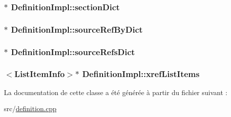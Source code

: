 \subsubsection[{section\+Dict}]{$\ast$ Definition\+Impl\+::section\+Dict}\label{class_definition_impl_a34e4463846d5f873f07509ae80e38724}
\hypertarget{class_definition_impl_a854eb82c0fc4b42d42892b42ce924e39}{}
\subsubsection[{source\+Ref\+By\+Dict}]{$\ast$ Definition\+Impl\+::source\+Ref\+By\+Dict}\label{class_definition_impl_a854eb82c0fc4b42d42892b42ce924e39}
\hypertarget{class_definition_impl_af37154064cce9133525a1b3badb4a11d}{}
\subsubsection[{source\+Refs\+Dict}]{$\ast$ Definition\+Impl\+::source\+Refs\+Dict}\label{class_definition_impl_af37154064cce9133525a1b3badb4a11d}
\hypertarget{class_definition_impl_a17e3c2a8898eb19fd5c2f044876de607}{}
\subsubsection[{xref\+List\+Items}]{$<${\bf List\+Item\+Info}$>$$\ast$ Definition\+Impl\+::xref\+List\+Items}\label{class_definition_impl_a17e3c2a8898eb19fd5c2f044876de607}


La documentation de cette classe a été générée à partir du fichier suivant \+:\begin{DoxyCompactItemize}
\item 
src/\hyperlink{definition_8cpp}{definition.\+cpp}\end{DoxyCompactItemize}
